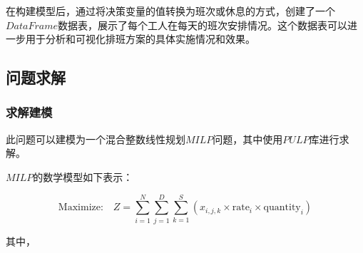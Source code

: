 \documentclass[withoutpreface,bwprint]{cumcmthesis}
\begin{document}
在构建模型后，通过将决策变量的值转换为班次或休息的方式，创建了一个\(DataFrame\)数据表，展示了每个工人在每天的班次安排情况。这个数据表可以进一步用于分析和可视化排班方案的具体实施情况和效果。

\begin{table}[htbp]
  \centering
  \caption{排版方案具体实施情况和效果}
  \label{tab:example}
\end{table}

\subsection{问题求解}

\subsubsection{求解建模}

此问题可以建模为一个混合整数线性规划\(MILP\)问题，其中使用\(PULP\)库进行求解。

\(MILP\)的数学模型如下表示：

\[ \text{Maximize:} \quad Z = \sum_{i=1}^{N} \sum_{j=1}^{D} \sum_{k=1}^{S} (x_{i,j,k} \times \text{rate}_{i} \times \text{quantity}_{i}) \]

其中，
\end{document}
